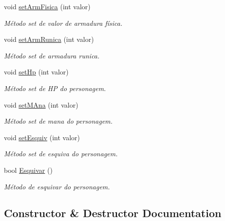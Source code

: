 \begin{DoxyCompactItemize}
void \mbox{\hyperlink{classpersonagem_ac1561638f8684db27731b49ddbc5c386}{set\+Arm\+Fisica}} (int valor)
\begin{DoxyCompactList}\small\item\em Método set de valor de armadura física. \end{DoxyCompactList}\item 
void \mbox{\hyperlink{classpersonagem_aad825560abd7cd0a8760d4ee38baa612}{set\+Arm\+Runica}} (int valor)
\begin{DoxyCompactList}\small\item\em Método set de armadura runica. \end{DoxyCompactList}\item 
void \mbox{\hyperlink{classpersonagem_a9805607809f9b49ab19e3f02f20c86a2}{set\+Hp}} (int valor)
\begin{DoxyCompactList}\small\item\em Método set de HP do personagem. \end{DoxyCompactList}\item 
void \mbox{\hyperlink{classpersonagem_a40f2128ed721ed117a6e03c026082700}{set\+M\+Ana}} (int valor)
\begin{DoxyCompactList}\small\item\em Método set de mana do personagem. \end{DoxyCompactList}\item 
void \mbox{\hyperlink{classpersonagem_ab1c07cf6fcd0831d83ba624af01f9f04}{set\+Esquiv}} (int valor)
\begin{DoxyCompactList}\small\item\em Método set de esquiva do personagem. \end{DoxyCompactList}\item 
bool \mbox{\hyperlink{classpersonagem_ad03eea0bb9c6eec82fec3202da055309}{Esquivar}} ()
\begin{DoxyCompactList}\small\item\em Método de esquivar do personagem. \end{DoxyCompactList}\end{DoxyCompactItemize}


\subsection{Constructor \& Destructor Documentation}
\mbox{\label{classpersonagem_ab07283c6d509230657835ef6ceed411d}} 
